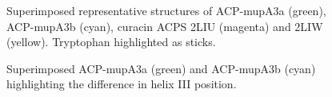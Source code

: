 			\setlength\fboxsep{5pt}
			\setlength\fboxrule{1.5pt}
			\begin{figure}[]
			\centering
			\caption[Superimposed representative structures of ACP-mupA3a (green), ACP-mupA3b (cyan), curacin ACPS 2LIU (magenta) and 2LIW (yellow).]{Superimposed representative structures of ACP-mupA3a (green), ACP-mupA3b (cyan), curacin ACPS 2LIU (magenta) and 2LIW (yellow). Tryptophan highlighted as sticks.}
			\label{fig:allacps}
			\end{figure}
	
			\setlength\fboxsep{5pt}
			\setlength\fboxrule{1.5pt}
			\begin{figure}[]
			\centering
			\caption[Superimposed ACP-mupA3a (green) and ACP-mupA3b (cyan) highlighting the difference in helix III position.]{Superimposed ACP-mupA3a (green) and ACP-mupA3b (cyan) highlighting the difference in helix III position.}
			\label{fig:diffhelix3}
			\end{figure}
		
